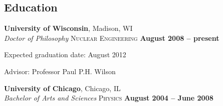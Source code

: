 \documentclass[margin,line]{resume}
\begin{document}
\begin{resume}
    \section{\mysidestyle Education}

    \textbf{University of Wisconsin}, Madison, WI \vspace{1mm}\\\vspace{1mm}%
    \textsl{Doctor of Philosophy} \textsc{Nuclear Engineering}\hfill \textbf{ August 2008 -- present}\vspace{-3mm}\\\vspace{-1mm}%
    \begin{list2}
        \item Expected graduation date: August 2012
        \item Advisor:  Professor Paul P.H. Wilson                
    \end{list2}
		\textbf{University of Chicago}, Chicago, IL \vspace{1mm}\\\vspace{1mm}%
		\textsl{Bachelor of Arts and Sciences}\textsc{ Physics} \hfill \textbf{August 2004 -- June 2008}\vspace{-3mm}\\\vspace{-1mm}%


\end{resume}
\end{document}
